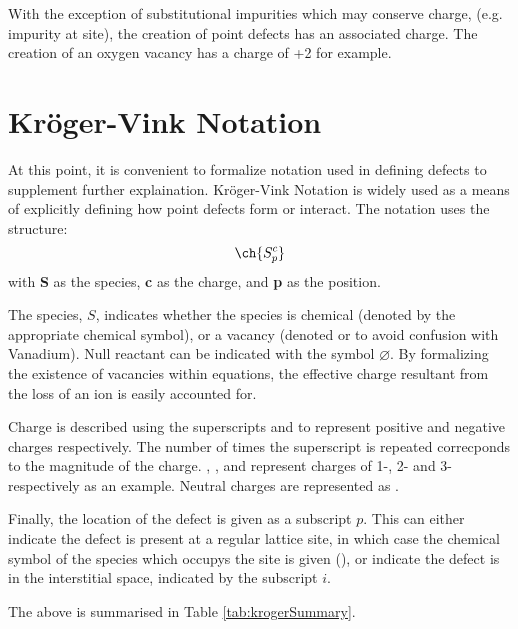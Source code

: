 With the exception of substitutional impurities which may conserve charge, (e.g.  impurity at  site), the creation of point defects has an associated charge. The creation of an oxygen vacancy has a charge of +2 for example.

\newpage
\section{Kr\"oger-Vink Notation}
At this point, it is convenient to formalize notation used in defining defects to supplement further explaination.
Kr\"oger-Vink Notation \citep{Kroger1958} is widely used as a means of explicitly defining how point defects form or interact.
The notation uses the structure: \begin{equation}
\ch{S^c_{p}}
\label{eq:kroger}
\end{equation} with \textbf{S} as the species, \textbf{c} as the charge, and \textbf{p} as the position.

The species, $S$, indicates whether the species is chemical (denoted by the appropriate chemical symbol), or a vacancy (denoted  or  to avoid confusion with Vanadium).
Null reactant can be indicated with the symbol $\varnothing$.
By formalizing the existence of vacancies within equations, the effective charge resultant from the loss of an ion is easily accounted for.

Charge is described using the superscripts  and  to represent positive and negative charges respectively. The number of times the superscript is repeated correcponds to the magnitude of the charge.
, , and  represent charges of 1-, 2- and 3- respectively as an example.
Neutral charges are represented as .

Finally, the location of the defect is given as a subscript $p$.
This can either indicate the defect is present at a regular lattice site, in which case the chemical symbol of the species which occupys the site is given (), or indicate the defect is in the interstitial space, indicated by the subscript $i$.

The above is summarised in Table \ref{tab:krogerSummary}.
\newpage

